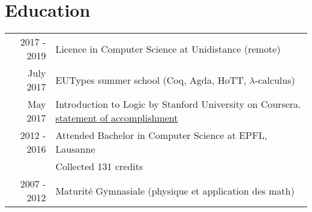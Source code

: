 \documentclass[a4paper,10pt]{article} %
\begin{document}
\section{Education}
\renewcommand{\arraystretch}{1.3}
\begin{tabular}{rp{11cm}}	
2017 - 2019 & Licence in Computer Science at Unidistance \footnotesize{(remote)}  \\ 

July 2017 & EUTypes summer school \footnotesize{(Coq, Agda, HoTT, $\lambda$-calculus)} \\
May 2017 & Introduction to Logic by Stanford University on Coursera. \footnotesize{\href{https://www.coursera.org/account/accomplishments/certificate/RPGEPLA94HFF}{statement of accomplishment}}\\
2012 - 2016 & Attended Bachelor in Computer Science at EPFL, Lausanne\\
& \footnotesize{Collected 131 credits}\\


2007 - 2012 & Maturité Gymnasiale \footnotesize{(physique et application des math)}
\end{tabular}

\end{document}
